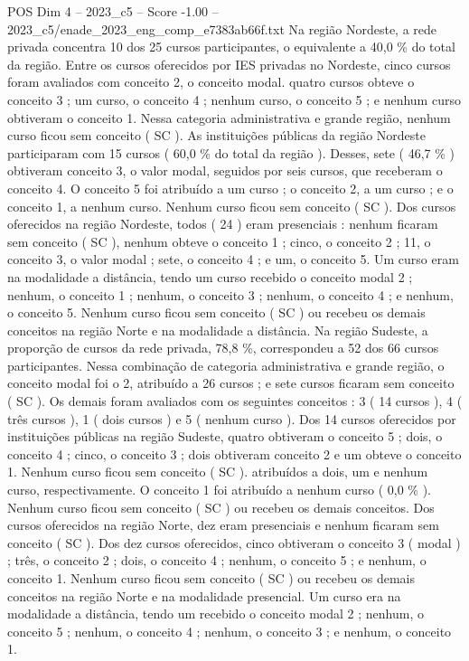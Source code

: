 \begin{textsample}{POS Dim 4 – 2023\_c5 – Score -1.00 – 2023\_c5/enade\_2023\_eng\_comp\_e7383ab66f.txt}
Na região Nordeste, a rede privada concentra 10 dos 25 cursos participantes, o equivalente a 40,0 \% do total da região.
Entre os cursos oferecidos por IES privadas no Nordeste, cinco cursos foram avaliados com conceito 2, o conceito modal. quatro cursos obteve o conceito 3 ; um curso, o conceito 4 ; nenhum curso, o conceito 5 ; e nenhum curso obtiveram o conceito 1.
Nessa categoria administrativa e grande região, nenhum curso ficou sem conceito ( SC ).
As instituições públicas da região Nordeste participaram com 15 cursos ( 60,0 \% do total da região ).
Desses, sete ( 46,7 \% ) obtiveram conceito 3, o valor modal, seguidos por seis cursos, que receberam o conceito 4.
O conceito 5 foi atribuído a um curso ; o conceito 2, a um curso ; e o conceito 1, a nenhum curso.
Nenhum curso ficou sem conceito ( SC ).
Dos cursos oferecidos na região Nordeste, todos ( 24 ) eram presenciais : nenhum ficaram sem conceito ( SC ), nenhum obteve o conceito 1 ; cinco, o conceito 2 ; 11, o conceito 3, o valor modal ; sete, o conceito 4 ; e um, o conceito 5.
Um curso eram na modalidade a distância, tendo um curso recebido o conceito modal 2 ; nenhum, o conceito 1 ; nenhum, o conceito 3 ; nenhum, o conceito 4 ; e nenhum, o conceito 5.
Nenhum curso ficou sem conceito ( SC ) ou recebeu os demais conceitos na região Norte e na modalidade a distância.
Na região Sudeste, a proporção de cursos da rede privada, 78,8 \%, correspondeu a 52 dos 66 cursos participantes.
Nessa combinação de categoria administrativa e grande região, o conceito modal foi o 2, atribuído a 26 cursos ; e sete cursos ficaram sem conceito ( SC ).
Os demais foram avaliados com os seguintes conceitos : 3 ( 14 cursos ), 4 ( três cursos ), 1 ( dois cursos ) e 5 ( nenhum curso ).
Dos 14 cursos oferecidos por instituições públicas na região Sudeste, quatro obtiveram o conceito 5 ; dois, o conceito 4 ; cinco, o conceito 3 ; dois obtiveram conceito 2 e um obteve o conceito 1.
Nenhum curso ficou sem conceito ( SC ). atribuídos a dois, um e nenhum curso, respectivamente.
O conceito 1 foi atribuído a nenhum curso ( 0,0 \% ).
Nenhum curso ficou sem conceito ( SC ) ou recebeu os demais conceitos.
Dos cursos oferecidos na região Norte, dez eram presenciais e nenhum ficaram sem conceito ( SC ).
Dos dez cursos oferecidos, cinco obtiveram o conceito 3 ( modal ) ; três, o conceito 2 ; dois, o conceito 4 ; nenhum, o conceito 5 ; e nenhum, o conceito 1.
Nenhum curso ficou sem conceito ( SC ) ou recebeu os demais conceitos na região Norte e na modalidade presencial.
Um curso era na modalidade a distância, tendo um recebido o conceito modal 2 ; nenhum, o conceito 5 ; nenhum, o conceito 4 ; nenhum, o conceito 3 ; e nenhum, o conceito 1.

\end{textsample}
